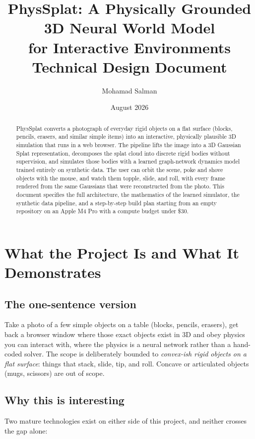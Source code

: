 \documentclass[11pt]{article}
\title{\textbf{PhysSplat: A Physically Grounded 3D Neural World Model \\ for Interactive Environments}\\[6pt]
\large Technical Design Document}
\author{Mohamad Salman}
\date{August 2026}
\begin{document}
\maketitle

\begin{abstract}
PhysSplat converts a photograph of everyday rigid objects on a flat surface (blocks, pencils, erasers, and similar simple items) into an interactive, physically plausible 3D simulation that runs in a web browser. The pipeline lifts the image into a 3D Gaussian Splat representation, decomposes the splat cloud into discrete rigid bodies without supervision, and simulates those bodies with a learned graph-network dynamics model trained entirely on synthetic data. The user can orbit the scene, poke and shove objects with the mouse, and watch them topple, slide, and roll, with every frame rendered from the same Gaussians that were reconstructed from the photo. This document specifies the full architecture, the mathematics of the learned simulator, the synthetic data pipeline, and a step-by-step build plan starting from an empty repository on an Apple M4 Pro with a compute budget under \$30.
\end{abstract}

\tableofcontents
\newpage

\section{What the Project Is and What It Demonstrates}

\subsection{The one-sentence version}
Take a photo of a few simple objects on a table (blocks, pencils, erasers), get back a browser window where those exact objects exist in 3D and obey physics you can interact with, where the physics is a neural network rather than a hand-coded solver. The scope is deliberately bounded to \emph{convex-ish rigid objects on a flat surface}: things that stack, slide, tip, and roll. Concave or articulated objects (mugs, scissors) are out of scope.

\subsection{Why this is interesting}
Two mature technologies exist on either side of this project, and neither crosses the gap alone:
\end{document}
